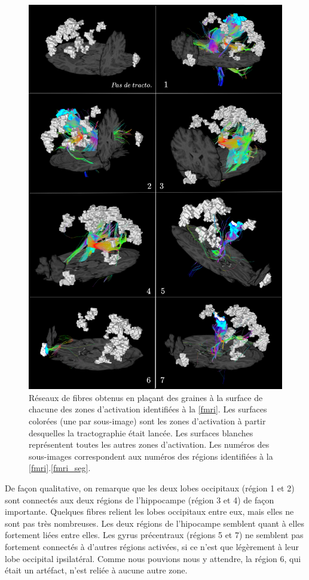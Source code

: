 \documentclass[a4paper]{article}
\begin{document}
\begin{figure}
\begin{center}
\includegraphics[height=.8\textheight]{fusion_dti}
\caption{Réseaux de fibres obtenus en plaçant des graines à la surface de chacune des zones d'activation identifiées à la \ref{fmri}. Les surfaces colorées (une par sous-image) sont les zones d'activation à partir desquelles la tractographie était lancée. Les surfaces blanches représentent toutes les autres zones d'activation. Les numéros des sous-images correspondent aux numéros des régions identifiées à la \ref{fmri}.\ref{fmri_seg}. 	\label{fusion_dti}}
\end{center}
\end{figure}

De façon qualitative, on remarque que les deux lobes occipitaux (région 1 et 2) sont connectés aux deux régions de l'hippocampe (région 3 et 4) de façon importante. Quelques fibres relient les lobes occipitaux entre eux, mais elles ne sont pas très nombreuses. Les deux régions de l'hipocampe semblent quant à elles fortement liées entre elles. Les gyrus précentraux (régions 5 et 7) ne semblent pas fortement connectés à d'autres régions activées, si ce n'est que légèrement à leur lobe occipital ipsilatéral. Comme nous pouvions nous y attendre, la région 6, qui était un artéfact, n'est reliée à aucune autre zone.
\end{document}
